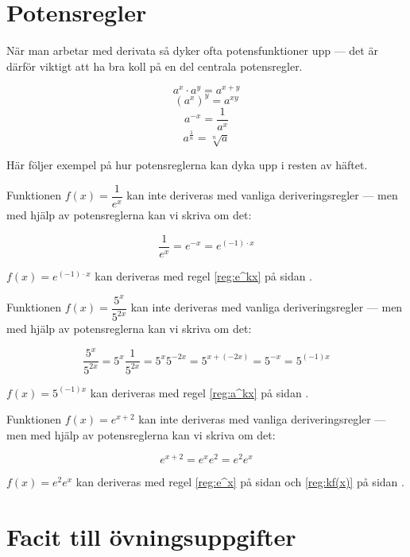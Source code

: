 \documentclass[a4paper, 12pt]{article}
\begin{document}
\newpage

\section{Potensregler}
\label{app:pot}
När man arbetar med derivata så dyker ofta potensfunktioner upp --- det är därför viktigt att ha bra koll på en del centrala potensregler.


\begin{regel}
    \[a^x \cdot a^y = a^{x+y} \]
    \[\left(a^x\right)^y = a^{xy}\]
    \[a^{-x} = \dfrac 1{a^x}\]
    \[a^{\frac 1n} = \sqrt[n]a\]
\end{regel}

Här följer exempel på hur potensreglerna kan dyka upp i resten av häftet.


\begin{exempel}
    Funktionen $f(x) = \dfrac1{e^x}$ kan inte deriveras med vanliga deriveringsregler --- men med hjälp av potensreglerna kan vi skriva om det:

    \[\dfrac1{e^x} = e^{-x} = e^{(-1)\cdot x}\]

    $f(x) = e^{(-1)\cdot x}$ kan deriveras med regel \ref*{reg:e^kx} på sidan \pageref*{reg:e^kx}.
\end{exempel}


\begin{exempel}
    Funktionen $f(x) = \dfrac {5^x}{5^{2x}}$ kan inte deriveras med vanliga deriveringsregler --- men med hjälp av potensreglerna kan vi skriva om det:

    \[\dfrac {5^x}{5^{2x}} = 5^x \dfrac 1{5^{2x}} = 5^x 5^{-2x} = 5^{x+(-2x)} = 5^{-x} = 5^{(-1)x}\]

    $f(x) = 5^{(-1)x}$ kan deriveras med regel \ref*{reg:a^kx} på sidan \pageref*{reg:a^kx}.

\end{exempel}

\begin{exempel}
    Funktionen $f(x) = e^{x+2}$ kan inte deriveras med vanliga deriveringsregler --- men med hjälp av potensreglerna kan vi skriva om det:

    \[e^{x+2} = e^xe^2 = e^2e^x\]

    $f(x) = e^2e^x$ kan deriveras med regel \ref*{reg:e^x} på sidan \pageref*{reg:e^x} och \ref*{reg:kf(x)} på sidan \pageref*{reg:kf(x)}.

\end{exempel}

\newpage
\section{Facit till övningsuppgifter}
\end{document}
